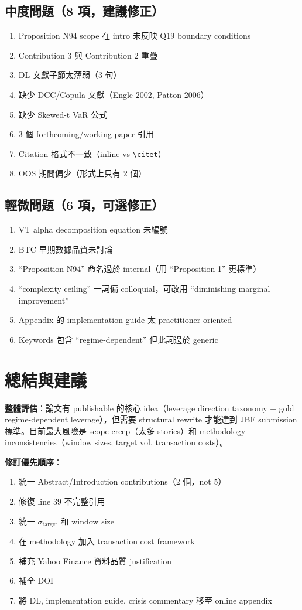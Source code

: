 \documentclass[12pt,a4paper]{article}
\begin{document}
\subsection*{\textcolor{warncolor}{中度問題（8 項，建議修正）}}
\begin{enumerate}[nosep]
\item Proposition N94 scope 在 intro 未反映 Q19 boundary conditions
\item Contribution 3 與 Contribution 2 重疊
\item DL 文獻子節太薄弱（3 句）
\item 缺少 DCC/Copula 文獻（Engle 2002, Patton 2006）
\item 缺少 Skewed-t VaR 公式
\item 3 個 forthcoming/working paper 引用
\item Citation 格式不一致（inline vs \texttt{\textbackslash citet}）
\item OOS 期間偏少（形式上只有 2 個）
\end{enumerate}

\subsection*{輕微問題（6 項，可選修正）}
\begin{enumerate}[nosep]
\item VT alpha decomposition equation 未編號
\item BTC 早期數據品質未討論
\item ``Proposition N94'' 命名過於 internal（用 ``Proposition 1'' 更標準）
\item ``complexity ceiling'' 一詞偏 colloquial，可改用 ``diminishing marginal improvement''
\item Appendix 的 implementation guide 太 practitioner-oriented
\item Keywords 包含 ``regime-dependent'' 但此詞過於 generic
\end{enumerate}

\section*{總結與建議}

\textbf{整體評估}：論文有 publishable 的核心 idea（leverage direction taxonomy + gold regime-dependent leverage），但需要 structural rewrite 才能達到 JBF submission 標準。目前最大風險是 scope creep（太多 stories）和 methodology inconsistencies（window sizes, target vol, transaction costs）。

\textbf{修訂優先順序}：
\begin{enumerate}
\item 統一 Abstract/Introduction contributions（2 個，not 5）
\item 修復 line 39 不完整引用
\item 統一 $\sigma_{\text{target}}$ 和 window size
\item 在 methodology 加入 transaction cost framework
\item 補充 Yahoo Finance 資料品質 justification
\item 補全 DOI
\item 將 DL, implementation guide, crisis commentary 移至 online appendix
\end{enumerate}
\end{document}

